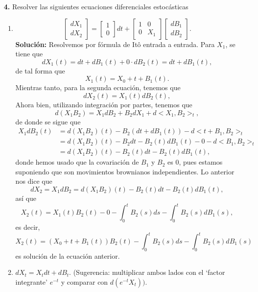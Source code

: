 \documentclass[letterpaper]{article}
\newcommand{\1}{\mathds{1}}
\theoremstyle{definition}
\theoremstyle{definition}
\theoremstyle{definition}
\theoremstyle{definition}
\theoremstyle{definition}
\begin{document}
\begin{enumerate}
    \item[\textbf{4.}] Resolver las siguientes ecuaciones diferenciales estocásticas 
    \begin{enumerate}
        \item \[
            \begin{bmatrix}
            dX_1\\
            dX_2
        \end{bmatrix}= \begin{bmatrix}
            1\\
            0
        \end{bmatrix}dt + \begin{bmatrix}
            1 & 0\\
            0 & X_1
        \end{bmatrix} \begin{bmatrix}
            dB_1\\
            dB_2
        \end{bmatrix}.
        \]
        \textbf{Solución:}
        Resolvemos por fórmula de Itô entrada a entrada. Para $X_1$, se tiene que 
        \[
        dX_1(t)=dt+dB_1(t)+0\cdot dB_2(t)=dt+dB_1(t),    
        \]
        de tal forma que 
        \[
        X_1(t)=X_0+t+B_1(t).    
        \]
        Mientras tanto, para la segunda ecuación, tenemos que 
        \[
            dX_2(t)=X_1(t)dB_2(t),
        \]
        Ahora bien, utilizando integración por partes, tenemos que 
        \[
            d(X_1B_2)=X_1dB_2+B_2dX_1+d<X_1,B_2>_t,
        \]  
        de donde se sigue que 
        \begin{align*}
            X_1dB_2(t)&=d(X_1B_2)(t)-B_2(dt+dB_1(t))-d<t+B_1,B_2>_t\\
            &=d(X_1B_2)(t)-B_2dt-B_2(t)dB_1(t)-0-d<B_1,B_2>_t\\
            &=d(X_1B_2)(t)-B_2(t)dt-B_2(t)dB_1(t),
        \end{align*}
        donde hemos usado que la covariación de $B_1$ y $B_2$ es 0, pues estamos suponiendo que son movimientos 
        brownianos independientes. Lo anterior nos dice que 
        \[
        dX_2=X_1dB_2=d(X_1B_2)(t)-B_2(t)dt-B_2(t)dB_1(t),    
        \]
        así que 
        \[
        X_2(t)=X_1(t)B_2(t)-0-\int_{0}^{t}B_2(s)ds -\int_{0}^{t}B_2(s)dB_1(s),   
        \]
        es decir, 
        \[
        X_2(t)=\left(X_0+t+B_1(t)\right)B_2(t)-\int_{0}^{t}B_2(s)ds-\int_{0}^{t}B_2(s)dB_1(s)
        \]
        es solución de la ecuación anterior.
        \item $dX_t=X_tdt + dB_t$. (Sugerencia: multiplicar ambos lados con el `factor integrante' $e^{-t}$
        y comparar con $d(e^{-t}X_t))$.\\


\end{enumerate}
\end{enumerate}
\end{document}
